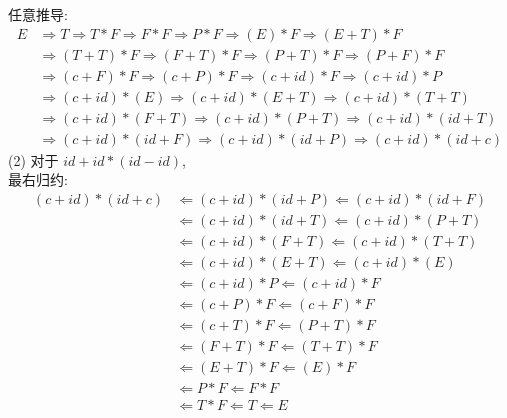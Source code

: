 \documentclass{article}
\begin{document}
任意推导:
\begin{align*}
    E & \Rightarrow T \Rightarrow T * F \Rightarrow F * F \Rightarrow P * F \Rightarrow (E) * F \Rightarrow (E + T) * F\\
      & \Rightarrow (T + T) * F \Rightarrow (F + T) * F \Rightarrow (P + T) * F \Rightarrow (P + F) * F\\
      & \Rightarrow (c + F) * F \Rightarrow (c + P) * F \Rightarrow (c + id) * F \Rightarrow (c + id) * P\\
      & \Rightarrow (c + id) * (E) \Rightarrow (c + id) * (E + T) \Rightarrow (c + id) * (T + T)\\
      & \Rightarrow (c + id) * (F + T) \Rightarrow (c + id) * (P + T) \Rightarrow (c + id) * (id + T)\\
      & \Rightarrow (c + id) * (id + F) \Rightarrow (c + id) * (id + P) \Rightarrow (c + id) * (id + c)    
\end{align*}
(2)
对于 $id + id * (id - id)$, \\
最右归约:
\begin{align*}
    (c + id) * (id + c) & \Leftarrow (c + id) * (id + P) \Leftarrow (c + id) * (id + F) \\
                        & \Leftarrow (c + id) * (id + T) \Leftarrow (c + id) * (P + T) \\
                        & \Leftarrow (c + id) * (F + T) \Leftarrow (c + id) * (T + T) \\
                        & \Leftarrow (c + id) * (E + T) \Leftarrow (c + id) * (E) \\
                        & \Leftarrow (c + id) * P \Leftarrow (c + id) * F \\
                        & \Leftarrow (c + P) * F \Leftarrow (c + F) * F \\
                        & \Leftarrow (c + T) * F \Leftarrow (P + T) * F \\
                        & \Leftarrow (F + T) * F \Leftarrow (T + T) * F \\
                        & \Leftarrow (E + T) * F \Leftarrow (E) * F \\
                        & \Leftarrow P * F \Leftarrow F * F \\
                        & \Leftarrow T * F \Leftarrow T \Leftarrow E
\end{align*}
\end{document}

